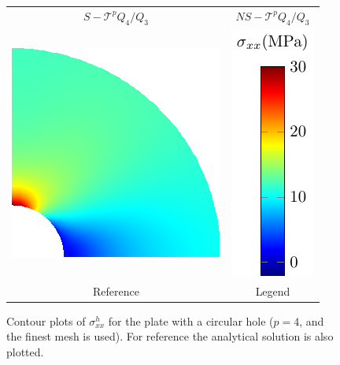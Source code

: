\documentclass{article}
\begin{document}
\begin{figure}[htb!]
\begin{tabular}{cc}
    $S-\mathcal{T}^{p} Q_4/Q_3$ & $NS-\mathcal{T}^{p} Q_4/Q_3$\\
    \includegraphics[width=.4\linewidth]{reference_stress_contour} & \includegraphics[width=.14\linewidth]{legend}\\
    Reference & Legend
    \end{tabular}
        \caption{ Contour plots of $\sigma_{xx}^h$ for the plate with a circular hole ($p=4$, and the finest mesh is used). For reference the analytical solution is also plotted. }
        \label{fig:platewithhole_contour}
\end{figure}
\end{document}
